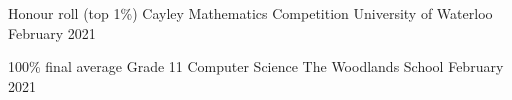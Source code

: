 
\begin{cvhonors}

  \cvhonor
    {Honour roll (top 1\%)} %
    {Cayley Mathematics Competition} %
    {University of Waterloo} %
    {February 2021} %

  \cvhonor
    {100\% final average} %
    {Grade 11 Computer Science} %
    {The Woodlands School} %
    {February 2021} %

\end{cvhonors}
